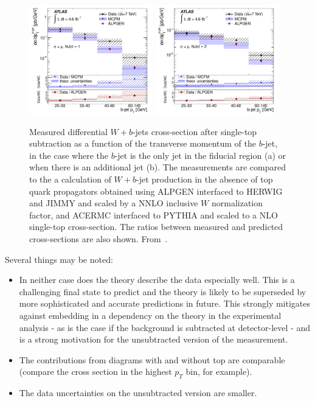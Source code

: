 \documentclass[11pt]{cernrep}
\begin{document}
\begin{figure}
\centering
	\includegraphics[width=0.48\textwidth]{fig_08a.pdf}
	\includegraphics[width=0.48\textwidth]{fig_08b.pdf}
\caption{\label{fig:notop}
Measured differential $W+b$-jets cross-section after single-top subtraction as a function of the transverse momentum of the $b$-jet, in the case where the $b$-jet is the only jet in the fiducial region (a) or when there is an additional jet (b). 
The measurements are compared to the a calculation of $W+b$-jet production in the absence of top quark propagators obtained using ALPGEN interfaced to HERWIG and JIMMY and scaled by a NNLO inclusive $W$ normalization factor, and ACERMC interfaced to PYTHIA and scaled to a NLO single-top cross-section. 
The ratios between measured and predicted cross-sections are also shown. From~\protect\cite{Aad:2013vka}.}
\end{figure}

Several things may be noted:
\begin{itemize}
\item In neither case does the theory describe the data especially well. This is a challenging
final state to predict and the theory is likely to be superseded by more sophisticated and 
accurate predictions in future. This strongly mitigates against embedding in a dependency 
on the theory in the experimental analysis - as is the case if the background is subtracted at detector-level - 
and is a strong motivation for the unsubtracted version of the measurement.
\item The contributions from diagrams with and without top are comparable (compare the cross section in the highest $p_T$ bin, 
for example).
\item The data uncertainties on the unsubtracted version are smaller.
\end{itemize}
\end{document}
